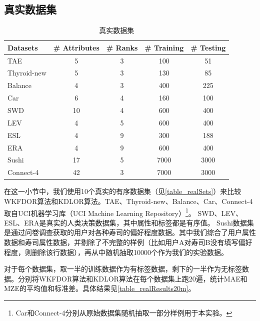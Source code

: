\subsection{真实数据集}
\label{wkfdor_realData}

\begin{table}[!htbp]
\caption{真实数据集}
\label{table_realSets}
\centering
\begin{tabular}{l|cccc}
\toprule
Datasets & \# Attributes & \# Ranks & \# Training & \# Testing\\
\midrule
TAE & 5 & 3 & 100 & 51\\
Thyroid-new & 5 & 3 & 130 & 85\\
Balance & 4 & 3 & 400 & 225\\
Car & 6 & 4 & 160 & 100\\
SWD & 10 & 4 & 600 & 400\\
LEV & 4 & 5 & 600 & 400\\
ESL & 4 & 9 & 300 & 188\\
ERA & 4 & 9 & 600 & 400\\
Sushi & 17 & 5 & 7000 & 3000 \\
Connect-4 & 42 & 3 & 7000 & 3000\\
\bottomrule
\end{tabular}
\end{table}

在这一小节中，我们使用10个真实的有序数据集（见\autoref{table_realSets}）来比较WKFDOR算法和KDLOR算法。TAE、Thyroid-new、Balance、Car、Connect-4取自UCI机器学习库（UCI Machine Learning Repository）\footnote{Car和Connect-4分别从原始数据集随机抽取一部分样例用于本实验。}\citep{Bache+Lichman:2013}。
SWD、LEV、ESL、ERA是真实的人类决策数据集，其中属性和标签都是有序值\citep{ben2006generating}。
Sushi数据集\citep{kamishima2009efficient}是通过问卷调查获取的用户对各种寿司的偏好程度数据。其中我们综合了用户属性数据和寿司属性数据，并剔除了不完整的样例（比如用户A对寿司B没有填写偏好程度，则删除该行数据），再从中随机抽取10000个作为我们的实验数据。

对于每个数据集，取一半的训练数据作为有标签数据，剩下的一半作为无标签数据。分别将WKFDOR算法和KDLOR算法在每个数据集上跑20遍，统计MAE和MZE的平均值和标准差。具体结果见\autoref{table_realResults20m}。

